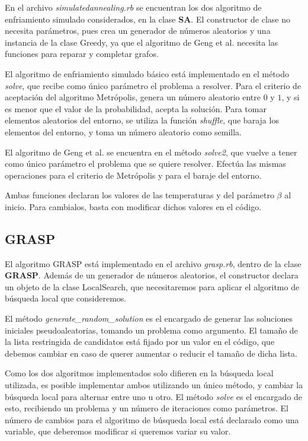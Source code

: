 En el archivo \textit{simulatedannealing.rb} se encuentran los dos algoritmo de
enfriamiento simulado considerados, en la clase \textbf{SA}. El constructor de
clase no necesita parámetros, pues crea un generador de números aleatorios y
una instancia de la clase Greedy, ya que el algoritmo de Geng et al. necesita
las funciones para reparar y completar grafos.

El algoritmo de enfriamiento simulado básico está implementado en el método
\textit{solve}, que recibe como único parámetro el problema a resolver. Para el
criterio de aceptación del algoritmo Metrópolis, genera un número aleatorio entre
$0$ y $1$, y si es menor que el valor de la probabilidad, acepta la solución.
Para tomar elementos aleatorios del entorno, se utiliza la función \textit{shuffle},
que baraja los elementos del entorno, y toma un número aleatorio como semilla.

El algoritmo de Geng et al. se encuentra en el método \textit{solve2}, que vuelve
a tener como único parámetro el problema que se quiere resolver. Efectúa las mismas
operaciones para el criterio de Metrópolis y para el baraje del entorno.

Ambas funciones declaran los valores de las temperaturas y del parámetro $\beta$
al inicio. Para cambialos, basta con modificar dichos valores en el código.

\subsection{GRASP}

El algoritmo GRASP está implementado en el archivo \textit{grasp.rb}, dentro de la
clase \textbf{GRASP}. Además de un generador de números aleatorios, el constructor
declara un objeto de la clase LocalSearch, que necesitaremos para aplicar el
algoritmo de búsqueda local que consideremos.

El método \textit{generate\_random\_solution} es el encargado de generar las soluciones
iniciales pseudoaleatorias, tomando un problema como argumento. El tamaño de la
lista restringida de candidatos está fijado por un valor en el código, que debemos
cambiar en caso de querer aumentar o reducir el tamaño de dicha lista.

Como los dos algoritmos implementados solo difieren en la búsqueda local utilizada,
es posible implementar ambos utilizando un único método, y cambiar la búsqueda local
para alternar entre uno u otro. El método \textit{solve} es el encargado de esto,
recibiendo un problema y un número de iteraciones como parámetros. El número de
cambios para el algoritmo de búsqueda local está declarado como una variable, que
deberemos modificar si queremos variar su valor.


